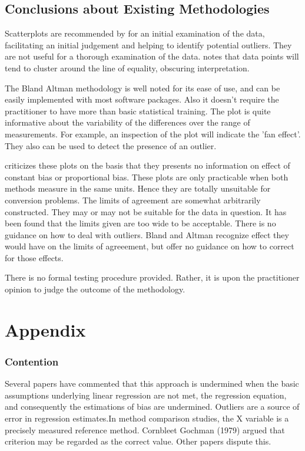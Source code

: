 \documentclass[12pt, a4paper]{report}
\begin{document}
\newpage
\section{Conclusions about Existing Methodologies}

Scatterplots are recommended by \citet{BA83} for an initial
examination of the data, facilitating an initial judgement and
helping to identify potential outliers. They are not useful for a
thorough examination of the data. \citet{BritHypSoc} notes that
data points will tend to cluster around the line of equality,
obscuring interpretation.


The Bland Altman methodology is well noted for its ease of use,
and can be easily implemented with most software packages. Also it
doesn't require the practitioner to have more than basic
statistical training. The plot is quite informative about the
variability of the differences over the range of measurements. For
example, an inspection of the plot will indicate the 'fan effect'.
They also can be used to detect the presence of an outlier.

 \citet{ludbrook97,ludbrook02}criticizes these plots on the
basis that they presents no information on effect of constant bias
or proportional bias. These plots are only practicable when both
methods measure in the same units. Hence they are totally
unsuitable for conversion problems. The limits of agreement are
somewhat arbitrarily constructed. They may or may not be suitable
for the data in question. It has been found that the limits given
are too wide to be acceptable. There is no guidance on how to deal
with outliers. Bland and Altman recognize effect they would have
on the limits of agreeement, but offer no guidance on how to
correct for those effects.

There is no formal testing procedure provided. Rather, it is upon
the practitioner opinion to judge the outcome of the methodology.







\chapter{Appendix}


\subsection{Contention }
Several papers have commented that this approach is undermined
when the basic assumptions underlying linear regression are not
met, the regression equation, and consequently the estimations of
bias are undermined. Outliers are a source of error in regression
estimates.In method comparison studies, the X variable is a
precisely measured reference method. Cornbleet Gochman (1979)
argued that criterion may be regarded as the correct value. Other
papers dispute this.
\end{document}
